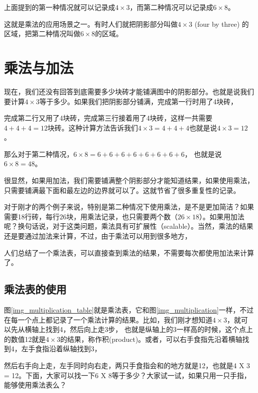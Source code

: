 上面提到的第一种情况就可以记录成$4\times3$，而第二种情况可以记录成$6\times8$。

这就是乘法的应用场景之一。有时人们就把阴影部分叫做$4\times3$ (four by three) 的区域，把第二种情况叫做$6\times8$的区域。

\section{乘法与加法}
现在，我们还没有回答到底需要多少块砖才能铺满图中的阴影部分。也就是说我们要计算$4\times3$等于多少。如果我们把阴影部分铺满，完成第一行时用了4块砖，

完成第二行又用了4块砖，完成第三行接着用了4块砖，这样一共需要$4 + 4 + 4 = 12$块砖。这种计算方法告诉我们$4\times3 = 4 + 4 + 4$也就是说$4\times 3 = 12$。

那么对于第二种情况，$6\times 8 = 6 + 6 + 6 + 6 + 6 + 6 + 6 + 6$， 也就是说 $6\times 8 = 48$。

很显然，如果用加法，我们需要铺满整个阴影部分才能知道结果，如果使用乘法，只需要铺满最下面和最左边的边界就可以了。这就节省了很多重复性的记录。

对于刚才的两个例子来说，特别是第二种情况下使用乘法，是不是更加简洁？如果需要18行砖，每行26块，用乘法记录，也只需要两个数（$26\times 18$）。如果用加法呢？换句话说，对于这类问题，乘法具有可扩展性（scalable）。当然，乘法的结果还是要通过加法来计算，不过，由于乘法可以用到很多地方，

人们总结了一个乘法表，可以直接查到乘法的结果，不需要每次都使用加法来计算了。
\subsection{乘法表的使用} 图\ref{img_multiplication_table}就是乘法表，它和图\ref{img_multiplication}一样，不过在每一个点上都记录了一个乘法计算的结果。比如，我们刚才想知道$4\times3$，就可以先从横轴上找到4，然后向上走3步，
也就是纵轴上的3一样高的时候，这个点上的数值12就是$4\times3$的结果，称作积(product)。或者，可以右手食指先沿着横轴找到4，左手食指沿着纵轴找到3，

然后右手向上走，左手同时向右走，两只手食指会和的地方就是12，也就是4 X 3 = 12。下面，大家可以找一下6 X 8等于多少？大家试一试，如果只用一只手指，能够使用乘法表么？

